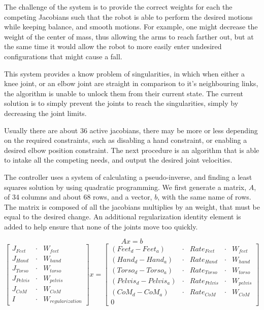 \documentclass[12pt]{report}
\begin{document}
The challenge of the system is to provide the correct weights for each the competing Jacobians such that the robot is able to perform the desired motions while keeping balance, and smooth motions. For example, one might decrease the weight of the center of mass, thus allowing the arms to reach farther out, but at the same time it would allow the robot to more easily enter undesired configurations that might cause a fall.

This system provides a know problem of singularities, in which when either a knee joint, or an elbow joint are straight in comparison to it's neighbouring links, the algorithm is unable to unlock them from their current state. The current solution is to simply prevent the joints to reach the singularities, simply by decreasing the joint limits. 

Usually there are about 36 active jacobians, there may be more or less depending on the required constraints, such as disabling a hand constraint, or enabling a desired elbow position constraint. The next procedure is an algorithm that is able to intake all the competing needs, and output the desired joint velocities. 

The controller uses a system of calculating a pseudo-inverse, and finding a least squares solution by using quadratic programming. We first generate a matrix, $A$, of 34 columns and about 68 rows, and a vector, $b$, with the same name of rows. The matrix is composed of all the jacobians multiplies by an weight, that must be equal to the desired change. An additional regularization identity element is added to help ensure that none of the joints move too quickly. 

\begin{equation} 
Ax = b 
\end{equation}
\begin{equation} 
\begin{bmatrix}
J_{Feet} &\cdot & W_{feet} \\
J_{Hand} &\cdot & W_{hand} \\
J_{Torso} &\cdot & W_{torso} \\
J_{Pelvis} &\cdot & W_{pelvis} \\
J_{CoM} &\cdot & W_{CoM} \\
I &\cdot & W_{regularization}
\end{bmatrix}
x = 
\begin{bmatrix}
(Feet_d - Feet_a) &\cdot & {Rate}_{Feet} &\cdot & W_{feet} \\
(Hand_d - Hand_a) &\cdot & {Rate}_{Hand} &\cdot & W_{hand} \\
(Torso_d - Torso_a) &\cdot & {Rate}_{Torso} &\cdot & W_{torso} \\
(Pelvis_d - Pelvis_a) &\cdot & {Rate}_{Pelvis} &\cdot & W_{pelvis} \\
(CoM_d - CoM_a) &\cdot & {Rate}_{CoM} &\cdot & W_{CoM} \\
0
\end{bmatrix}
\end{equation}
\end{document}
